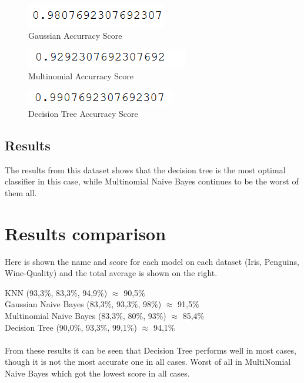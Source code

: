 \documentclass{article}
\begin{document}
\begin{figure}[!h]
  \centering
  \caption{Gaussian Accurracy Score}
    \includegraphics[scale=0.7]{GaussianWine.png}
\end{figure}


\begin{figure}[!h]
  \caption{Multinomial Accurracy Score}
  \centering
    \includegraphics[scale=0.7]{multiWine.png}
\end{figure}

\begin{figure}[!h]
  \caption{Decision Tree Accurracy Score}
  \centering
    \includegraphics[scale=0.7]{treeWine.png}
\end{figure}
\FloatBarrier

\subsection{Results}
The results from this dataset shows that the decision tree is the most optimal classifier in this case, while Multinomial Naive Bayes continues to be the worst of them all.

\section{Results comparison}
Here is shown the name and score for each model on each dataset (Iris, Penguins, Wine-Quality) and the total average is shown on the right.

\bigskip

\noindent KNN (93,3\%, 83,3\%, 94,9\%)   \hfill            $\approx$ 90,5\%  \\
Gaussian Naive Bayes (83,3\%, 93,3\%, 98\%) \hfill     $\approx$ 91,5\%  \\
Multinomial Naive Bayes (83,3\%, 80\%, 93\%) \hfill     $\approx$ 85,4\% \\
Decision Tree (90,0\%, 93,3\%, 99,1\%) \hfill         $\approx$ 94,1\% \\
\\
From these results it can be seen that Decision Tree performs well in most cases, though it is not the most accurate one in all cases. Worst of all in MultiNomial Naive Bayes which got the lowest score in all cases.
\end{document}
